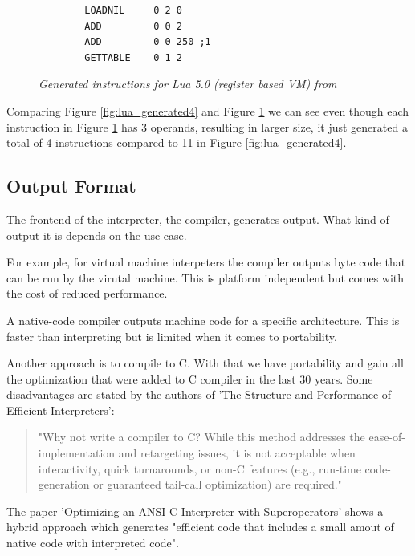 \documentclass{article}
\begin{document}
\begin{figure}[ht]
    \begin{verbatim}
        LOADNIL     0 2 0
        ADD         0 0 2
        ADD         0 0 250 ;1
        GETTABLE    0 1 2
    \end{verbatim}
    \caption{\textit{Generated instructions for Lua 5.0 (register based VM) from ~\cite{lua_implementation}}}
    \label{fig:lua_generated5}
\end{figure}

Comparing Figure \ref{fig:lua_generated4} and Figure \ref{fig:lua_generated5}
we can see even though each instruction in Figure \ref{fig:lua_generated5} has 3 operands,
resulting in larger size, it just generated a total of 4 instructions compared
to 11 in Figure \ref{fig:lua_generated4}.

\subsection{Output Format}
The frontend of the interpreter, the compiler, generates output. What kind
of output it is depends on the use case.

For example, for virtual machine interpeters the compiler outputs byte code that
can be run by the virutal machine. This is platform independent but comes with
the cost of reduced performance.

A native-code compiler outputs machine code for a specific architecture. This is faster
than interpreting but is limited when it comes to portability.

Another approach is to compile to C. With that we have portability and gain all the 
optimization that were added to C compiler in the last 30 years. Some disadvantages
are stated by the authors of 'The Structure and Performance of Efficient Interpreters':

\begin{quotation} 
"Why not write a compiler to C? While this method addresses the
ease-of-implementation and retargeting issues, it is not acceptable when
interactivity, quick turnarounds, or non-C features (e.g., run-time
code-generation or guaranteed tail-call optimization) are required."
~\cite{structure_and_performance}
\end{quotation} 

The paper 'Optimizing an ANSI C Interpreter with Superoperators' shows a hybrid
approach which generates "efficient code that includes a small amout of native
code with interpreted code". ~\cite{superoperator}
\end{document}
